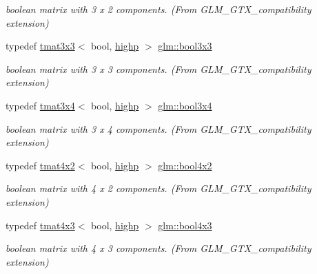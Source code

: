 \begin{DoxyCompactItemize}
\begin{DoxyCompactList}\small\item\em boolean matrix with 3 x 2 components. (From G\+L\+M\+\_\+\+G\+T\+X\+\_\+compatibility extension) \end{DoxyCompactList}\item 
typedef \mbox{\hyperlink{structglm_1_1tmat3x3}{tmat3x3}}$<$ bool, \mbox{\hyperlink{namespaceglm_a0f04f086094c747d227af4425893f545ac6f7eab42eacbb10d59a58e95e362074}{highp}} $>$ \mbox{\hyperlink{group__gtx__compatibility_ga5c0ded80422867674cd651ab2261f2a3}{glm\+::bool3x3}}
\begin{DoxyCompactList}\small\item\em boolean matrix with 3 x 3 components. (From G\+L\+M\+\_\+\+G\+T\+X\+\_\+compatibility extension) \end{DoxyCompactList}\item 
typedef \mbox{\hyperlink{structglm_1_1tmat3x4}{tmat3x4}}$<$ bool, \mbox{\hyperlink{namespaceglm_a0f04f086094c747d227af4425893f545ac6f7eab42eacbb10d59a58e95e362074}{highp}} $>$ \mbox{\hyperlink{group__gtx__compatibility_gaf3777caf1e50112919be2939be05ae7e}{glm\+::bool3x4}}
\begin{DoxyCompactList}\small\item\em boolean matrix with 3 x 4 components. (From G\+L\+M\+\_\+\+G\+T\+X\+\_\+compatibility extension) \end{DoxyCompactList}\item 
typedef \mbox{\hyperlink{structglm_1_1tmat4x2}{tmat4x2}}$<$ bool, \mbox{\hyperlink{namespaceglm_a0f04f086094c747d227af4425893f545ac6f7eab42eacbb10d59a58e95e362074}{highp}} $>$ \mbox{\hyperlink{group__gtx__compatibility_ga2d956a9ea3d4c8e8ec12797c9d7cb677}{glm\+::bool4x2}}
\begin{DoxyCompactList}\small\item\em boolean matrix with 4 x 2 components. (From G\+L\+M\+\_\+\+G\+T\+X\+\_\+compatibility extension) \end{DoxyCompactList}\item 
typedef \mbox{\hyperlink{structglm_1_1tmat4x3}{tmat4x3}}$<$ bool, \mbox{\hyperlink{namespaceglm_a0f04f086094c747d227af4425893f545ac6f7eab42eacbb10d59a58e95e362074}{highp}} $>$ \mbox{\hyperlink{group__gtx__compatibility_gafd85fa864c89a6b1b4887d2790132c5c}{glm\+::bool4x3}}
\begin{DoxyCompactList}\small\item\em boolean matrix with 4 x 3 components. (From G\+L\+M\+\_\+\+G\+T\+X\+\_\+compatibility extension) \end{DoxyCompactList}\item 

\end{DoxyCompactItemize}
